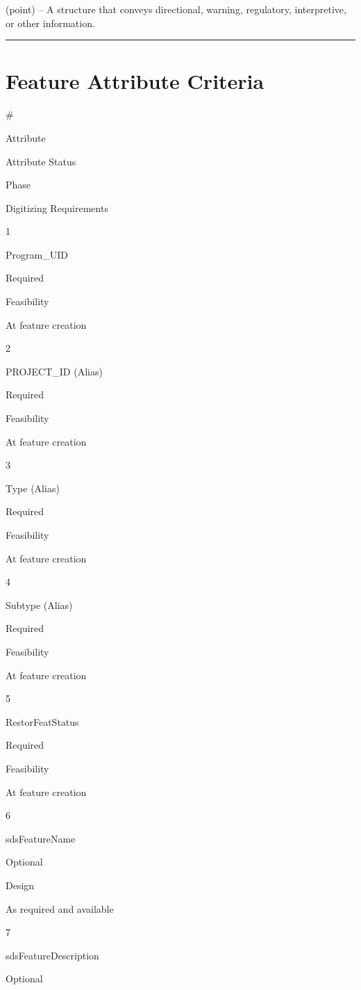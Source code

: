 \documentclass[
  letterpaper,
  DIV=11,
  numbers=noendperiod]{scrreprt}
\begin{document}
(point) -- A structure that conveys directional, warning, regulatory,
interpretive, or other information.

\begin{center}\rule{0.5\linewidth}{0.5pt}\end{center}

\section{Feature Attribute
Criteria}\label{feature-attribute-criteria-24}

\#

Attribute

Attribute Status

Phase

Digitizing Requirements

1

Program\_UID

Required

Feasibility

At feature creation

2

PROJECT\_ID (Alias)

Required

Feasibility

At feature creation

3

Type (Alias)

Required

Feasibility

At feature creation

4

Subtype (Alias)

Required

Feasibility

At feature creation

5

RestorFeatStatus

Required

Feasibility

At feature creation

6

sdsFeatureName

Optional

Design

As required and available

7

sdsFeatureDescription

Optional
\end{document}
